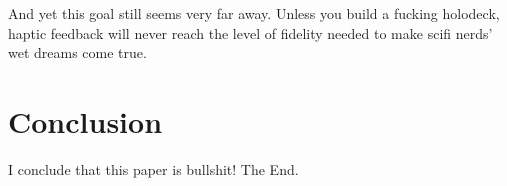 \documentclass[11pt]{article}
\begin{document}
And yet this goal still seems very far away. Unless you build a fucking holodeck, haptic feedback will never reach the level of fidelity needed to make scifi nerds' wet dreams come true.


\section{Conclusion}
I conclude that this paper is bullshit! The End.





\end{document}

